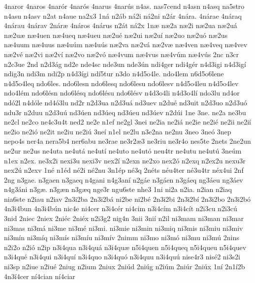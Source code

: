 {4naror
4naros
4nar^^f3r
4nar^^f3s
4narus
4nar^^fas
n4as.
nas7cend
n4asn
n4asq
na5stro
n4asu
n4asv
n2at
n4aue
na2x3
1n^^e1
n2^^e1b
n^^e12i
n^^e12ni
n2^^e1r
4n^^e1ra.
4n^^e1rae
4n^^e1raq
4n^^e1rau
4n^^e1rav
2n^^e1r^^e6
4n^^e1ros
4n^^e1rus
n2^^e1t
n^^e12x
1n^^e6
n^^e62a
n^^e62i
n^^e62ua
n^^e62u^^e1
n^^e62u^^e6
n^^e64uen
n^^e64ueq
n^^e64ueu
n^^e62u^^e9
n^^e62ui
n^^e62u^^ed
n^^e62uo
n^^e62u^^f3
n^^e62us
n^^e64uum
n^^e64uus
n^^e64u^^fam
n^^e64u^^fas
n^^e62va
n^^e62v^^e1
n^^e62v^^e6
n^^e64ven
n^^e64veq
n^^e64vev
n^^e62v^^e9
n^^e62vi
n^^e62v^^ed
n^^e62vo
n^^e62v^^f3
n^^e64vum
n^^e64vus
n^^e64v^^fam
n^^e64v^^fas
2nc
n3cr
n2c3ue
2nd
n2d3^^e1g
nd2e
nde4sc
nde3un
nde3^^fan
ndi4ger
ndi4g^^e9r
n4d3igi
n4d3ig^^ed
ndig3n
ndi3m
ndi2p
n4d3^^edgi
nd^^ed5tur
n3do
n4d5o4le.
ndo4lem
n6d5o6lene
n4d5o4leq
ndo6les.
ndo6lesn
ndo6lesq
ndo6lesu
ndo6lesv
n4d5o4leu
n4d5o4lev
ndo4l^^e9m
ndo6l^^e9sn
ndo6l^^e9sq
ndo6l^^e9su
ndo6l^^e9sv
n4d3o4li
n4d3o4l^^ed
ndo3lu
nd4or
nd^^f32l
n4d^^f3le
nd4^^f33lu
nd2r
n2d3ua
n2d3u^^e1
nd3uev
n2du^^e9
nd3uit
n2d3uo
n2d3u^^f3
ndu3r
n2duu
n2d3u^^fa
nd3^^faen
nd3^^faeq
nd3^^faeu
nd3^^faev
n2d^^fai
1ne
3ne.
ne2a
ne3bu
ne2cl
ne2co
ne4c3u4t
ned2
ne2e
n1ef
ne2gl
3nei
ne2ia
ne2i^^e1
ne2ie
ne2i^^e9
ne2ii
ne2i^^ed
ne2io
ne2i^^f3
ne2it
ne2iu
ne2i^^fa
3ne^^ed
n1el
ne2lu
n3e2na
ne2nu
3neo
3ne^^f3
3nep
nepo4s
ner4a
nera5b4
ner6abu
ne3rae
ne3r2^^e63
ne3riu
ne3r4o
nes5te
2nets
2ne2un
ne2ur
ne2us
ne4uta
ne4ut^^e1
ne4ut^^ed
ne4uto
ne4ut^^f3
neu4tr
ne4utu
ne4ut^^fa
3ne^^fam
n1ex
n2ex.
ne3x2i
nexi3u
nexi3v
nex2^^ed
n2exn
ne2xo
nex2^^f3
n2exq
n2ex2u
nexu3r
nex2^^fa
n2exv
1n^^e9
n1^^e9d
n^^e92i
n^^e92nu
3n1^^e9p
n^^e93q
2n^^e9ts
n^^e9u4ter
n^^e93u4tr
n^^e9x4ui
2nf
2ng
n3gae.
n3gaen
n3gaeq
n4gani
n4g3an^^ed
n2g^^e1e
n3g^^e1en
n3g^^e1eq
ng3^^e1eu
ng3^^e1ev
n4g3^^e1ni
n3g^^e6.
n3g^^e6n
n3g^^e6q
nge3r
ngu6ste
nhe3
1ni
ni2a
n2ia.
n2ian
n2iaq
nia6ste
n2iau
n2iav
2n3i2ba
2n3i2b^^e1
ni2be
ni2b^^e9
2n3i2bi
2n3i2b^^ed
2n3i2bo
2n3i2b^^f3
4n3i4bun
4n3i4b^^fan
nic4e
ni4cer
n3i4c^^e9r
ni4cim
n3i4c^^edm
n3i4c^^edt
n2i3cu
n2i3c^^fa
3nid
2niec
2niex
2ni^^e9c
2ni^^e9x
n2i3g2
nig4n
3nii
3ni^^ed
n2il
ni3mam
ni3man
ni3mar
ni3mas
ni3m^^e1
ni3me
ni3m^^e9
ni3mi.
ni3mie
ni3min
ni3miq
ni3mis
ni3miu
ni3miv
ni3m^^edn
ni3m^^edq
ni3m^^eds
ni3m^^edu
ni3m^^edv
2nimm
ni3mo
ni3m^^f3
ni3mu
ni3m^^fa
2nins
n2i2o
n2i^^f3
n2ip
n3i4qua
n3i4qu^^e1
n3i4qu^^e6
n5i4quen
n5i4queq
n5i4queu
n5i4quev
n3i4qu^^e9
n3i4qui
n3i4qu^^ed
n3i4quo
n3i4qu^^f3
n3i4quu
n3i4qu^^fa
nise4r3
nis^^e92
ni3s2i
ni3sp
n2iue
n2iu^^e9
2niug
n2ium
2niux
2ni^^fad
2ni^^fag
n2i^^fam
2ni^^far
2ni^^fax
1n^^ed
2n1^^ed2b
4n3^^ed4cer
n^^ed4cian
n^^ed4ciar
}
